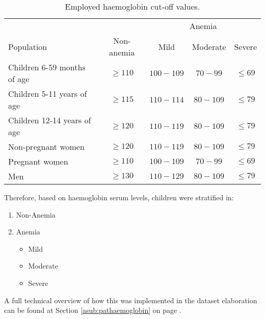 \begin{table}[H]
   \centering
   \begin{tabular}{l c c c c}
   	  & & \multicolumn{3}{c}{Anemia\footnotemark[1]}\\
   	 \cline{3-5}
      Population & Non-anemia\footnotemark[1] & Mild\footnotemark[2] & Moderate & Severe\\
      \hline
      Children 6-59 months of age & $\geqslant 110$ & $100-109$ & $70-99$ & $\leqslant 69$\\
      Children 5-11 years of age & $\geqslant115$ & $110-114$ & $80-109$ & $\leqslant 79$\\
      Children 12-14 years of age & $\geqslant120$ & $110-119$ & $80-109$ & $\leqslant 79$\\
      Non-pregnant women & $\geqslant120$ & $110-119$ & $80-109$ & $\leqslant 79$\\
      Pregnant women & $\geqslant110$ & $100-109$ & $70-99$ & $\leqslant 69$\\
      Men & $\geqslant130$ & $110-129$ & $80-109$ & $\leqslant 79$\\
   \end{tabular}
   \caption{Employed haemoglobin cut-off values.}
    \label{tab:cutoffhaemo}
\end{table}

Therefore, based on haemoglobin serum levels, children were stratified in:
\begin{enumerate}
	\item Non-Anemia
	\item Anemia
	\begin{itemize}
		\item Mild
		\item Moderate\footnotemark[2]
		\item Severe
	\end{itemize}
\end{enumerate}


A full technical overview of how this was implemented in the dataset elaboration can be found at Section \ref{asub:pathaemoglobin} on page \pageref{asub:pathaemoglobin}.

